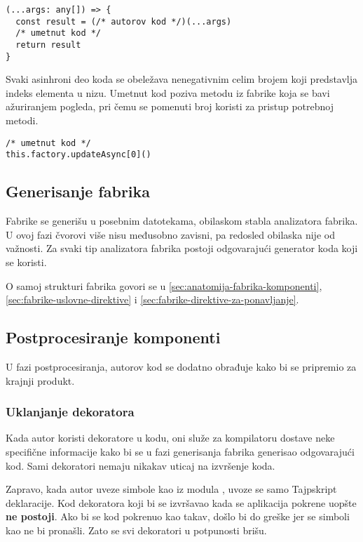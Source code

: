 \begin{lstlisting}
(...args: any[]) => {
  const result = (/* autorov kod */)(...args)
  /* umetnut kod */
  return result
}
\end{lstlisting}

Svaki asinhroni deo koda se obeležava nenegativnim celim brojem koji predstavlja indeks elementa u nizu.
Umetnut kod poziva metodu iz fabrike koja se bavi ažuriranjem pogleda, pri čemu se pomenuti broj koristi za pristup potrebnoj metodi.

\begin{lstlisting}
/* umetnut kod */
this.factory.updateAsync[0]()
\end{lstlisting}

\subsection{Generisanje fabrika}

Fabrike se generišu u posebnim datotekama, obilaskom stabla analizatora fabrika.
U ovoj fazi čvorovi više nisu međusobno zavisni, pa redosled obilaska nije od važnosti.
Za svaki tip analizatora fabrika postoji odgovarajući generator koda koji se koristi.

O samoj strukturi fabrika govori se u \cref{sec:anatomija-fabrika-komponenti}, \cref{sec:fabrike-uslovne-direktive} i \cref{sec:fabrike-direktive-za-ponavljanje}.

\subsection{Postprocesiranje komponenti}

U fazi postprocesiranja, autorov kod se dodatno obrađuje kako bi se pripremio za krajnji produkt.

\subsubsection{Uklanjanje dekoratora}

Kada autor koristi dekoratore u kodu, oni služe za kompilatoru dostave neke specifične informacije kako bi se u fazi generisanja fabrika generisao odgovarajući kod.
Sami dekoratori nemaju nikakav uticaj na izvršenje koda.

Zapravo, kada autor uveze simbole kao  iz modula , uvoze se samo Tajpskript deklaracije.
Kod dekoratora koji bi se izvršavao kada se aplikacija pokrene uopšte \textbf{ne postoji}.
Ako bi se kod pokrenuo kao takav, došlo bi do greške  jer se simboli kao  ne bi pronašli.
Zato se svi dekoratori u potpunosti brišu.

